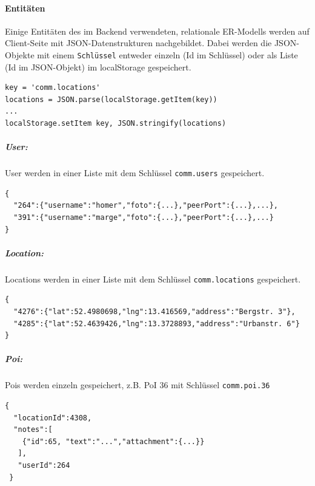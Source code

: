 \paragraph{Entitäten}
Einige Entitäten des im Backend verwendeten, relationale ER-Modells werden auf Client-Seite mit JSON-Datenstrukturen nachgebildet. Dabei werden die JSON-Objekte mit einem \texttt{Schlüssel} entweder einzeln (Id im Schlüssel) oder als Liste (Id im JSON-Objekt) im localStorage gespeichert.
\lstset{language=JavaScript}
\begin{lstlisting}[frame=single,xleftmargin=0pt,numbers=none,caption={Lesen und Speichern von JSON-Objekten mit localStorage},captionpos=b]
key = 'comm.locations'
locations = JSON.parse(localStorage.getItem(key))
...
localStorage.setItem key, JSON.stringify(locations)
\end{lstlisting}

\subparagraph{User:}
User werden in einer Liste mit dem Schlüssel \texttt{comm.users} gespeichert.
\lstset{language=JavaScript}
\begin{lstlisting}[frame=single,xleftmargin=0pt,numbers=none,caption={users.json},captionpos=b]
{
  "264":{"username":"homer","foto":{...},"peerPort":{...},...},
  "391":{"username":"marge","foto":{...},"peerPort":{...},...}
}
\end{lstlisting}

\subparagraph{Location:}
Locations werden in einer Liste mit dem Schlüssel \texttt{comm.locations} gespeichert.
\lstset{language=JavaScript}
\begin{lstlisting}[frame=single,xleftmargin=0pt,numbers=none,caption={locations.json},captionpos=b]
{
  "4276":{"lat":52.4980698,"lng":13.416569,"address":"Bergstr. 3"},
  "4285":{"lat":52.4639426,"lng":13.3728893,"address":"Urbanstr. 6"}
}
\end{lstlisting}

\subparagraph{Poi:}
Pois werden einzeln gespeichert, z.B. PoI 36 mit Schlüssel \texttt{comm.poi.36}
\lstset{language=JavaScript}
\begin{lstlisting}[frame=single,xleftmargin=0pt,numbers=none,caption={poi.json},captionpos=b]
{
  "locationId":4308,
  "notes":[
    {"id":65, "text":"...","attachment":{...}}
   ],
   "userId":264
 }
\end{lstlisting}

